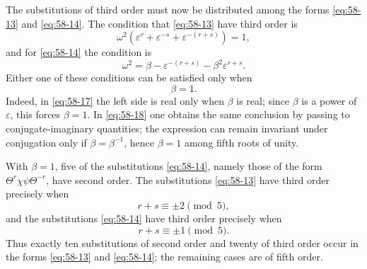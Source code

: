\documentclass[11pt,a4paper]{book}
\newcommand{\eps}{\varepsilon}
\begin{document}
The substitutions of third order must now be distributed among the forms \eqref{eq:58-13} and \eqref{eq:58-14}.  The condition that \eqref{eq:58-13} have third order is
\begin{equation}\label{eq:58-17}
 \omega^2(\eps^r+\eps^{-s}+\eps^{-(r+s)})=1,
\end{equation}
and for \eqref{eq:58-14} the condition is
\begin{equation}\label{eq:58-18}
 \omega^2=\beta-\eps^{-(r+s)}-\beta^2\eps^{r+s}.
\end{equation}
Either one of these conditions can be satisfied only when
\[
 \beta=1.
\]
Indeed, in \eqref{eq:58-17} the left side is real only when \(\beta\) is real; since \(\beta\) is a power of \(\eps\), this forces \(\beta=1\).  In \eqref{eq:58-18} one obtains the same conclusion by passing to conjugate-imaginary quantities; the expression can remain invariant under conjugation only if \(\beta=\beta^{-1}\), hence \(\beta=1\) among fifth roots of unity.

With \(\beta=1\), five of the substitutions \eqref{eq:58-14}, namely those of the form \(\Theta^r\chi\psi\Theta^{-r}\), have second order.  The substitutions \eqref{eq:58-13} have third order precisely when
\begin{equation}\label{eq:58-third-a}
 r+s\equiv \pm 2 \pmod 5,
\end{equation}
and the substitutions \eqref{eq:58-14} have third order precisely when
\begin{equation}\label{eq:58-third-b}
 r+s\equiv \pm 1 \pmod 5.
\end{equation}
Thus exactly ten substitutions of second order and twenty of third order occur in the forms \eqref{eq:58-13} and \eqref{eq:58-14}; the remaining cases are of fifth order.
\end{document}

